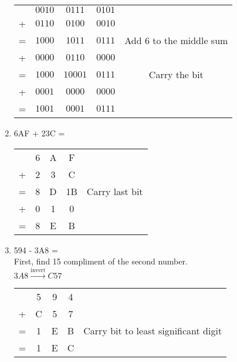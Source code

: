 \documentclass[a4paper]{article}
\begin{document}
\begin{enumerate}[label=(\alph*)]
\begin{tabular}{ccccc}
 &$0010$&$0111$&$0101$&  \\
+&$0110$&$0100$&$0010$& \\ \hline
=&$1000$&$1011$&$0111$&Add 6 to the middle sum \\
+&$0000$&$0110$&$0000$&\\ \hline
=&$1000$&$10001$&$0111$& Carry the bit\\ 
+&$0001$&$0000$&$0000$&\\ \hline
=&$1001$&$0001$&$0111$&\\\hline
\end{tabular}
\item 
6AF + 23C = \\
\begin{tabular}{c|c|c|c|c|}
                \hline
                 &6&A&F&  \\ 
                +&2&3&C&  \\ \hline
                =&8&D&1B&Carry last bit  \\ 
                +&0&1&0&\\ \hline
                =&8&E&B
            \end{tabular}
\item
594 - 3A8 =\\First, find 15 compliment of the second number.\\
$3A8 \xrightarrow{\text{invert}} C57$ 
\begin{tabular}{c|c|c|c|c|}
                \hline
                 &5&9&4&  \\ 
                +&C&5&7&  \\ \hline
                =&1&E&B&Carry bit to least significant digit  \\ 
                =&1&E&C&
            \end{tabular}
\end{enumerate}
\end{document}

